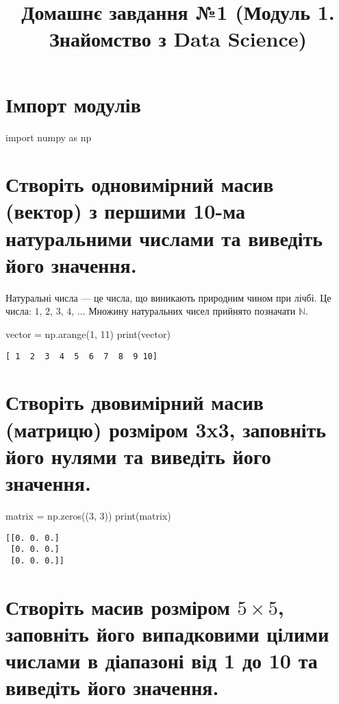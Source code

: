 \documentclass[]{article}
\title{Домашнє завдання №1 (Модуль 1. Знайомство з Data Science)}
\makeatletter
\newcommand{\boxspacing}{\kern\kvtcb@left@rule\kern\kvtcb@boxsep}
\newcommand{\prompt}[4]{
        {\ttfamily\llap{{\color{#2}[#3]:\hspace{3pt}#4}}\vspace{-\baselineskip}}
    }
\newcounter{in}
\def\in{\prompt{In}{incolor}{\stepcounter{in}\thein}{\boxspacing}}
\makeatother
\begin{document}
\maketitle





\section{Імпорт модулів}

\in%
\begin{pythoncode}
import numpy as np
\end{pythoncode}




\section{Створіть одновимірний масив (вектор) з першими 10-ма
	натуральними числами та виведіть його значення.}

Натуральні числа --- це числа, що виникають природним чином при лічбі.
Це числа: \(1\), \(2\), \(3\), \(4\), \(\ldots\) Множину натуральних
чисел прийнято позначати \(\mathbb{N}\).

\in
\begin{pythoncode}
vector = np.arange(1, 11)
print(vector)
\end{pythoncode}


\begin{Verbatim}[commandchars=\\\{\}]
	[ 1  2  3  4  5  6  7  8  9 10]
\end{Verbatim}

\section{Створіть двовимірний масив (матрицю) розміром 3x3,
	заповніть його нулями та виведіть його
	значення.}
\in
\begin{pythoncode}
matrix = np.zeros((3, 3))
print(matrix)
\end{pythoncode}

\begin{Verbatim}[commandchars=\\\{\}]
[[0. 0. 0.]
 [0. 0. 0.]
 [0. 0. 0.]]
\end{Verbatim}

\section{\texorpdfstring{Створіть масив розміром \(5\times 5\), 		заповніть його випадковими цілими числами в діапазоні від 1 до 10 та 		виведіть його
		значення.}{3. Створіть масив розміром 5\textbackslash times 5, заповніть його випадковими цілими числами в діапазоні від 1 до 10 та виведіть його значення.}}
\end{document}
